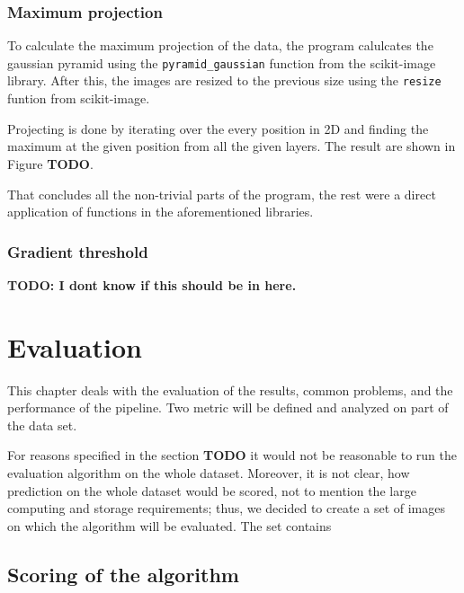 \documentclass[
  digital,     %
  oneside,     %
  nosansbold,  %
  nocolorbold, %
  lof,         %
  lot,         %
]{fithesis4}
\begin{document}
\subsection{Maximum projection} To calculate the maximum projection of the data,
the program calulcates the gaussian pyramid using the \texttt{pyramid\_gaussian}
function from the scikit-image library. After this, the images are resized to
the previous size using the \texttt{resize} funtion from scikit-image.

Projecting is done by iterating over the every position in 2D and finding the
maximum at the given position from all the given layers. The result are shown in
Figure \textbf{TODO}.

That concludes all the non-trivial parts of the program, the rest were a direct
application of functions in the aforementioned libraries.

\subsection{Gradient threshold}
\textbf{TODO: I dont know if this should be in here.}

\chapter{Evaluation}
This chapter deals with the evaluation of the results, common problems, and the
performance of the pipeline. Two metric will be defined and analyzed on part of
the data set.

For reasons specified in the section \textbf{TODO} it would not be reasonable
to run the evaluation algorithm on the whole dataset. Moreover, it is not clear,
how prediction on the whole dataset would be scored, not to mention the large
computing and storage requirements; thus, we decided to create a set of images
on which the algorithm will be evaluated. The set contains %

\section{Scoring of the algorithm}
\end{document}
